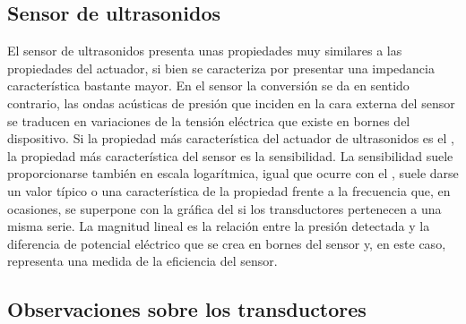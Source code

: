 \subsection{Sensor de ultrasonidos}

El sensor de ultrasonidos presenta unas propiedades muy similares a las
propiedades del actuador, si bien se caracteriza por presentar una
impedancia característica bastante mayor. En el sensor la conversión se da
en sentido contrario, las ondas acústicas de presión que inciden en la cara
externa del sensor se traducen en variaciones de la tensión eléctrica que
existe en bornes del dispositivo. Si la propiedad más característica del
actuador de ultrasonidos es el , la propiedad más característica
del sensor es la sensibilidad. La sensibilidad suele proporcionarse también
en escala logarítmica, igual que ocurre con el , suele darse un
valor típico o una característica de la propiedad frente a la frecuencia
que, en ocasiones, se superpone con la gráfica del  si los
transductores pertenecen a una misma serie. La magnitud lineal es la
relación entre la presión detectada y la diferencia de potencial eléctrico
que se crea en bornes del sensor y, en este caso, representa una medida de
la eficiencia del sensor.


\subsection{Observaciones sobre los transductores}

